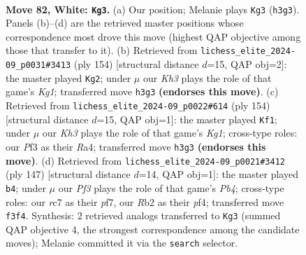 \documentclass[11pt]{article}
\begin{document}
\clearpage

\begin{figure}[p]\centering
\begin{subfigure}{0.46\textwidth}\centering
\resizebox{\linewidth}{!}{%
\newchessgame
\chessboard[
  setfen={R7/2r2p2/4p2k/8/P3P3/5P1K/1R6/8 w - - 55 82},
  showmover=false,
  pgfstyle=straightmove, color=movearrow, markmove={h3-g3}
]}
\caption{}
\end{subfigure}\hfill
\begin{subfigure}{0.46\textwidth}\centering
\resizebox{\linewidth}{!}{%
\newchessgame
\chessboard[
  setfen={8/5k2/7R/r6p/5Pp1/6P1/8/6K1 w - - 7 78},
  showmover=false,
  pgfstyle=straightmove, color=movearrow, markmove={g1-g2}
]}
\caption{}
\end{subfigure}
\\[4pt]
\begin{subfigure}{0.46\textwidth}\centering
\resizebox{\linewidth}{!}{%
\newchessgame
\chessboard[
  setfen={8/8/5kp1/8/R4Pp1/6P1/1r6/6K1 w - - 59 78},
  showmover=false,
  pgfstyle=straightmove, color=movearrow, markmove={g1-f1}
]}
\caption{}
\end{subfigure}\hfill
\begin{subfigure}{0.46\textwidth}\centering
\resizebox{\linewidth}{!}{%
\newchessgame
\chessboard[
  setfen={r7/3K1P1k/8/1p5p/p4P2/8/8/6R1 b - - 0 74},
  showmover=false,
  pgfstyle=straightmove, color=movearrow, markmove={b5-b4}
]}
\caption{}
\end{subfigure}
\caption{\textbf{Move 82, White: \texttt{Kg3}.} (a) Our position; Melanie plays \texttt{Kg3} (\texttt{h3g3}). Panels (b)--(d) are the retrieved master positions whose correspondence most drove this move (highest QAP objective among those that transfer to it). (b) Retrieved from \texttt{lichess\_elite\_2024-09\_p0031\#3413} (ply 154) [structural distance $d$=15, QAP obj=2]: the master played \texttt{Kg2}; under $\mu$ our \emph{Kh3} plays the role of that game's \emph{Kg1}; transferred move \texttt{h3g3} \textbf{(endorses this move)}. (c) Retrieved from \texttt{lichess\_elite\_2024-09\_p0022\#614} (ply 154) [structural distance $d$=15, QAP obj=1]: the master played \texttt{Kf1}; under $\mu$ our \emph{Kh3} plays the role of that game's \emph{Kg1}; cross-type roles: our \emph{P}f3 as their \emph{R}a4; transferred move \texttt{h3g3} \textbf{(endorses this move)}. (d) Retrieved from \texttt{lichess\_elite\_2024-09\_p0021\#3412} (ply 147) [structural distance $d$=14, QAP obj=1]: the master played \texttt{b4}; under $\mu$ our \emph{Pf3} plays the role of that game's \emph{Pb4}; cross-type roles: our \emph{r}c7 as their \emph{p}f7, our \emph{R}b2 as their \emph{p}f4; transferred move \texttt{f3f4}. Synthesis: 2 retrieved analogs transferred to \texttt{Kg3} (summed QAP objective 4, the strongest correspondence among the candidate moves); Melanie committed it via the \texttt{search} selector.}
\label{fig:thought-m162}
\end{figure}
\end{document}

